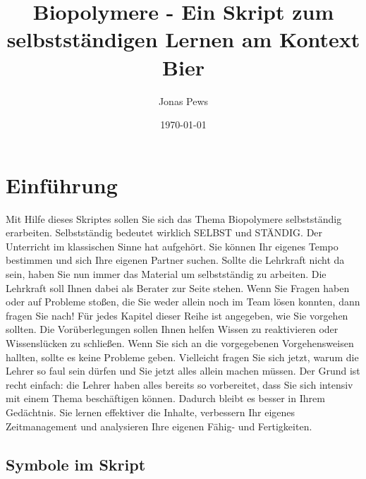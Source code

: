 \documentclass{scrartcl}  %
\author{Jonas Pews}
\title{Biopolymere - Ein Skript zum selbstständigen Lernen am Kontext Bier}
\date{\today}
\begin{document}
	\maketitle
	
	\begin{center}
		\ccbyncsa
	\end{center}
	

\pagebreak

	\tableofcontents

\pagebreak

	\section{Einführung}

		Mit Hilfe dieses Skriptes sollen Sie sich das Thema Biopolymere selbstständig erarbeiten. Selbstständig bedeutet wirklich SELBST und STÄNDIG. Der Unterricht im klassischen Sinne hat aufgehört. Sie können Ihr eigenes Tempo bestimmen und sich Ihre eigenen Partner suchen. Sollte die Lehrkraft nicht da sein, haben Sie nun immer das Material um selbstständig zu arbeiten.
		Die Lehrkraft soll Ihnen dabei als Berater zur Seite stehen. Wenn Sie Fragen haben oder auf Probleme stoßen, die Sie weder allein noch im Team lösen konnten, dann fragen Sie nach! \newline
		Für jedes Kapitel dieser Reihe ist angegeben, wie Sie vorgehen sollten. Die Vorüberlegungen sollen Ihnen helfen Wissen zu reaktivieren oder Wissenslücken zu schließen. Wenn Sie sich an die vorgegebenen Vorgehensweisen hallten, sollte es keine Probleme geben.
		Vielleicht fragen Sie sich jetzt, warum die Lehrer so faul sein dürfen und Sie jetzt alles allein machen müssen. Der Grund ist recht einfach: die Lehrer haben alles bereits so vorbereitet, dass Sie sich intensiv mit einem Thema beschäftigen können. Dadurch bleibt es besser in Ihrem Gedächtnis. Sie lernen effektiver die Inhalte, verbessern Ihr eigenes Zeitmanagement und analysieren Ihre eigenen Fähig- und Fertigkeiten. \newline

		\subsection{Symbole im Skript}

\end{document}
